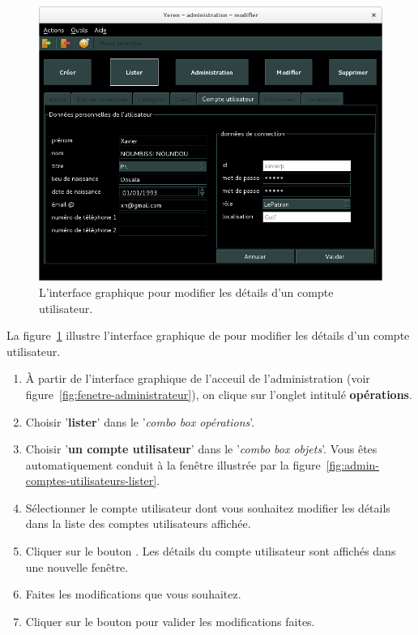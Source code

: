 \begin{figure}[!htpb]
	\centering
	\includegraphics[scale=0.45]{images/compte-utilisateur-modifier.png}
	\caption{L'interface graphique pour modifier les d\'etails
			d'un compte utilisateur.}
	\label{fig:admin-comptes-utilisateurs-modifier}
\end{figure}

La figure~\ref{fig:admin-comptes-utilisateurs-modifier} illustre
l'interface graphique de \yeroth pour modifier les d\'etails
d'un compte utilisateur.

\begin{enumerate}[1)]
	\item \`A partir de l'interface graphique de l'acceuil de
		l'administration (voir figure~\ref{fig:fenetre-administrateur}),
		on clique sur l'onglet intitul\'e \textbf{op\'erations}. 
		
	\item Choisir '\textbf{lister}' dans le '\emph{combo box
		op\'erations}'.
		
	\item Choisir '\textbf{un compte utilisateur}' dans
		le '\emph{combo box objets}'. Vous \^etes automatiquement
		conduit \`a la fen\^etre illustr\'ee par la
		figure~\ref{fig:admin-comptes-utilisateurs-lister}.
		
	\item S\'electionner le compte utilisateur dont vous souhaitez
		modifier les d\'etails dans la liste des comptes
		utilisateurs affich\'ee.
		
	\item Cliquer sur le bouton . Les d\'etails
		du compte utilisateur sont affich\'es dans une nouvelle fen\^etre.
		
	\item Faites les modifications que vous souhaitez.
		
	\item Cliquer sur le bouton  pour valider
		les modifications faites.
\end{enumerate}

